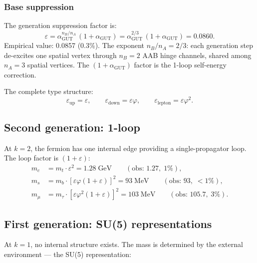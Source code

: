 \subsubsection{Base suppression}

The generation suppression factor is:
\begin{equation}
\varepsilon = \alpha_\text{GUT}^{n_B/n_A}\,(1 + \alpha_\text{GUT}) = \alpha_\text{GUT}^{2/3}\,(1 + \alpha_\text{GUT}) = 0.0860.
\end{equation}
Empirical value: 0.0857 (0.3\%). The exponent $n_B/n_A = 2/3$: each generation step de-excites one spatial vertex through $n_B = 2$ AAB hinge channels, shared among $n_A = 3$ spatial vertices. The $(1 + \alpha_\text{GUT})$ factor is the 1-loop self-energy correction.

The complete type structure:
\begin{equation}
\varepsilon_\text{up} = \varepsilon, \qquad \varepsilon_\text{down} = \varepsilon\varphi, \qquad \varepsilon_\text{lepton} = \varepsilon\varphi^2.
\end{equation}

\subsection{Second generation: 1-loop}

At $k = 2$, the fermion has one internal edge providing a single-propagator loop. The loop factor is $(1 + \varepsilon)$:
\begin{align}
m_c &= m_t \cdot \varepsilon^2 = 1.28\;\text{GeV} \qquad (\text{obs: } 1.27,\; 1\%), \\
m_s &= m_b \cdot [\varepsilon\varphi(1+\varepsilon)]^2 = 93\;\text{MeV} \qquad (\text{obs: } 93,\; <1\%), \\
m_\mu &= m_\tau \cdot [\varepsilon\varphi^2(1+\varepsilon)]^2 = 103\;\text{MeV} \qquad (\text{obs: } 105.7,\; 3\%).
\end{align}

\subsection{First generation: SU(5) representations}

At $k = 1$, no internal structure exists. The mass is determined by the external environment --- the SU(5) representation:

